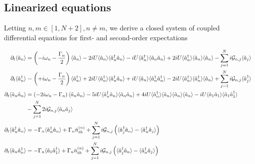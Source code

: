 \subsection{Linearized equations}
Letting $n, m \in \left[1, N+2\right], n \ne m$, we derive a closed system of coupled differential equations for first- and second-order expectations

\begin{align}\label{eqn:linearsystem}
\partial_t\langle\hat{a}_n\rangle &= \left(- i \omega_n - \frac{\Gamma_n}{2}\right)\langle\hat{a}_n\rangle - 2 i U \langle\hat{a}_n\rangle\langle\hat{a}_n^\dagger\hat{a}_n\rangle - i U \langle\hat{a}_n^\dagger\rangle\langle\hat{a}_n\hat{a}_n\rangle + 2 i U \langle\hat{a}_n^\dagger\rangle \langle\hat{a}_n\rangle\langle\hat{a}_n\rangle - \sum_{j=1}^N i \mathcal{G}_{n, j} \langle\hat{a}_j\rangle\\
\partial_t\langle\hat{a}_n^\dagger\rangle &= \left(+ i \omega_n - \frac{\Gamma_n}{2} \right) \langle\hat{a}_n^\dagger\rangle + 2 i U \langle\hat{a}_n^\dagger\rangle\langle\hat{a}_n^\dagger\hat{a}_n\rangle + i U \langle\hat{a}_n\rangle\langle\hat{a}_n^\dagger\hat{a}_n^\dagger\rangle - 2 i U\langle\hat{a}_n^\dagger\rangle\langle\hat{a}_n^\dagger\rangle\langle\hat{a}_n\rangle + \sum_{j=1}^N i \mathcal{G}_{n,j}\langle\hat{a}_j^\dagger\rangle \\
\partial_t\langle\hat{a}_n\hat{a}_n\rangle &= \left( - 2 i \omega_n - \Gamma_n\right) \langle\hat{a}_n\hat{a}_n\rangle - 5 i U \langle\hat{a}_n^\dagger \hat{a}_n\rangle \langle\hat{a}_n\hat{a}_n\rangle + 4 i U \langle\hat{a}_n^\dagger\rangle \langle\hat{a}_n\rangle \langle\hat{a}_n\rangle\langle\hat{a}_n\rangle - i U \langle \hat{a}_1\hat{a}_1\rangle\langle\hat{a}_1\hat{a}_1^\dagger\rangle \notag \\
&- \sum_{j=1}^N 2 i \mathcal{G}_{n, j}\langle\hat{a}_n\hat{a}_j\rangle \\
\partial_t \langle\hat{a}_n^\dagger\hat{a}_n\rangle &= - \Gamma_n\langle\hat{a}_n^\dagger\hat{a}_n\rangle + \Gamma_n \bar{n}_{th}^{\left(n\right)} + \sum_{j=1}^N i \mathcal{G}_{n, j}\left(\langle\hat{a}_j^\dagger\hat{a}_n\rangle - \langle\hat{a}_n^\dagger\hat{a}_j\rangle\right) \\
\partial_t \langle\hat{a}_n \hat{a}_n^\dagger\rangle &= - \Gamma_n \langle\hat{a}_1\hat{a}_1^\dagger\rangle + \Gamma_n \bar{n}_{th}^{\left(n\right)} + \sum_{j=1}^N i \mathcal{G}_{n,j}\left(\langle\hat{a}_j^\dagger\hat{a}_n\rangle - \langle\hat{a}_n^\dagger\hat{a}_j\rangle \right)
\\

\end{align}
